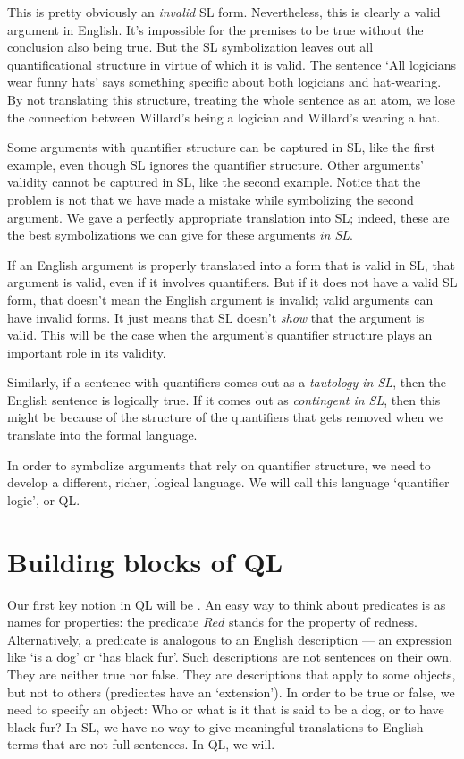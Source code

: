 This is pretty obviously an \emph{invalid} SL form. Nevertheless, this is clearly a valid argument in English. It's impossible for the premises to be true without the conclusion also being true. But the SL symbolization leaves out all quantificational structure in virtue of which it is valid. The sentence `All logicians wear funny hats' says something specific about both logicians and hat-wearing. By not translating this structure, treating the whole sentence as an atom, we lose the connection between Willard's being a logician and Willard's wearing a hat.

Some arguments with quantifier structure can be captured in SL, like the first example, even though SL ignores the quantifier structure. Other arguments' validity cannot be captured in SL, like the second example. Notice that the problem is not that we have made a mistake while symbolizing the second argument. We gave a perfectly appropriate translation into SL; indeed, these are the best symbolizations we can give for these arguments \emph{in SL}.

If an English argument is properly translated into a form that is valid in SL, that argument is valid, even if it involves quantifiers. But if it does not have a valid SL form, that doesn't mean the English argument is invalid; valid arguments can have invalid forms. It just means that SL doesn't \emph{show} that the argument is valid. This will be the case when the argument's quantifier structure plays an important role in its validity.

Similarly, if a sentence with quantifiers comes out as a \emph{tautology in SL}, then the English sentence is logically true. If it comes out as \emph{contingent in SL}, then this might be because of the structure of the quantifiers that gets removed when we translate into the formal language.

In order to symbolize arguments that rely on quantifier structure, we need to develop a different, richer, logical language. We will call this language `quantifier logic', or QL. 

\section{Building blocks of QL}

Our first key notion in QL will be . {\color{black} An easy way to think about predicates is as names for properties: the predicate $Red$ stands for the property of redness.} Alternatively, a predicate is analogous to an English description  --- an expression like `is a dog' or `has black fur'. Such descriptions are not sentences on their own. They are neither true nor false. They are descriptions that apply to some objects, but not to others (predicates have an `extension'). In order to be true or false, we need to specify an object: Who or what is it that is said to be a dog, or to have black fur? In SL, we have no way to give meaningful translations to English terms that are not full sentences. In QL, we will.

